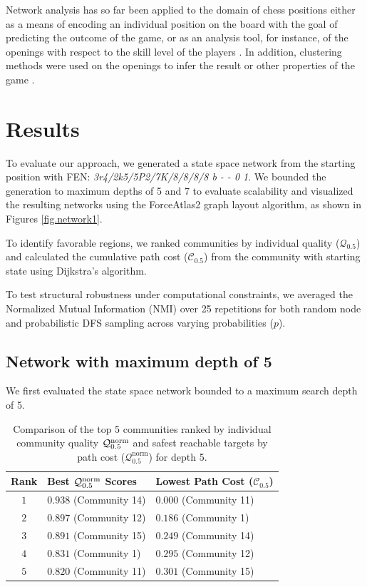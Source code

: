 \documentclass[9pt,twocolumn,twoside]{pnas-report}
\begin{document}
Network analysis has so far been applied to the domain of chess positions either as a means of encoding an individual position on the board \cite{chess} with the goal of predicting the outcome of the game, or as an analysis tool, for instance, of the openings with respect to the skill level of the players \cite{chess3}. In addition, clustering methods were used on the openings to infer the result or other properties of the game \cite{chess2}. 

\section*{Results}
To evaluate our approach, we generated a state space network from the starting position with FEN: \emph{3r4/2k5/5P2/7K/8/8/8/8 b - - 0 1}. We bounded the generation to maximum depths of 5 and 7 to evaluate scalability and visualized the resulting networks using the ForceAtlas2 \cite{atlas} graph layout algorithm, as shown in Figures \ref{fig.network1}.

To identify favorable regions, we ranked communities by individual quality ($\mathcal{Q}_{0.5}$) and calculated the cumulative path cost ($\mathcal{C}_{0.5}$) from the community with starting state using Dijkstra's algorithm.

To test structural robustness under computational constraints, we averaged the Normalized Mutual Information (NMI) over 25 repetitions for both random node and probabilistic DFS sampling across varying probabilities ($p$).

\subsection{Network with maximum depth of 5}
We first evaluated the state space network bounded to a maximum search depth of 5.

\begin{table}[ht!]
\centering
\caption{Comparison of the top 5 communities ranked by individual community quality $\mathcal{Q}_{0.5}^\textnormal{norm}$ and safest reachable targets by path cost ($\mathcal{Q}_{0.5}^\text{norm}$) for depth 5.}
\begin{tabular}{c l l}
\hline
\textbf{Rank} & \textbf{Best $\mathcal{Q}_{0.5}^\textnormal{norm}$ Scores} & \textbf{Lowest Path Cost ($\mathcal{C}_{0.5}$)} \\
\hline
$1$ & $0.938$ (Community 14) & $0.000$ (Community 11) \\
$2$ & $0.897$ (Community 12) & $0.186$ (Community 1) \\
$3$ & $0.891$ (Community 15) & $0.249$ (Community 14) \\
$4$ & $0.831$ (Community 1) & $0.295$ (Community 12) \\
$5$ & $0.820$ (Community 11) & $0.301$ (Community 15) \\
\hline
\end{tabular}
\label{table.network1.scores}
\end{table}
\end{document}
